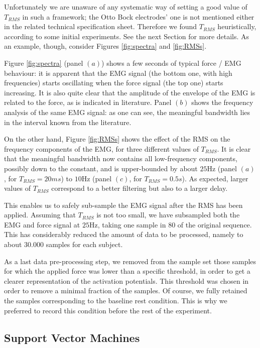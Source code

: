 Unfortunately we are unaware of any systematic way of setting a good
value of $T_{RMS}$ in such a framework; the Otto Bock electrodes' one
is not mentioned either in the related technical specification
sheet. Therefore we found $T_{RMS}$ heuristically, according to some
initial experiments. See the next Section for more details. As an
example, though, consider Figures \ref{fig:spectra} and
\ref{fig:RMSs}.

Figure \ref{fig:spectra} (panel $(a)$) shows a few seconds of typical
force / EMG behaviour: it is apparent that the EMG signal (the bottom
one, with high frequencies) starts oscillating when the force signal
(the top one) starts increasing. It is also quite clear that the
amplitude of the envelope of the EMG is related to the force, as is
indicated in literature. Panel $(b)$ shows the frequency analysis of
the same EMG signal: as one can see, the meaningful bandwidth lies in
the interval known from the literature.

On the other hand, Figure \ref{fig:RMSs} shows the effect of the RMS
on the frequency components of the EMG, for three different values of
$T_{RMS}$. It is clear that the meaningful bandwidth now contains all
low-frequency components, possibly down to the constant, and is
upper-bounded by about $25$Hz (panel $(a)$, for $T_{RMS}=20ms$) to
$10$Hz (panel $(c)$, for $T_{RMS}=0.5s$). As expected, larger values
of $T_{RMS}$ correspond to a better filtering but also to a larger
delay.

This enables us to safely sub-sample the EMG signal after the RMS has
been applied. Assuming that $T_{RMS}$ is not too small, we have
subsampled both the EMG and force signal at $25$Hz, taking one sample
in $80$ of the original sequence. This has considerably reduced the
amount of data to be processed, namely to about $30.000$ samples for
each subject.

As a last data pre-processing step, we removed from the sample set
those samples for which the applied force was lower than a specific
threshold, in order to get a clearer representation of the activation
potentials. This threshold was chosen in order to remove a minimal
fraction of the samples. Of course, we fully retained the samples
corresponding to the baseline rest condition. This is why we preferred
to record this condition before the rest of the experiment.

\subsection{Support Vector Machines}

